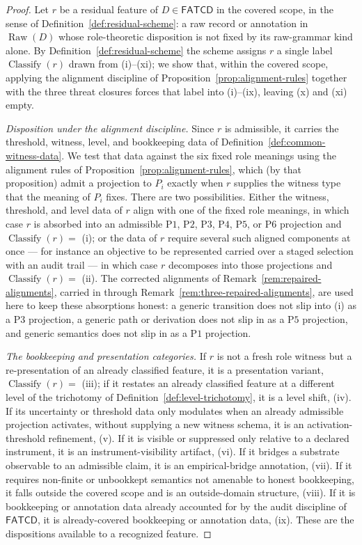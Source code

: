 \documentclass[11pt]{article}
\theoremstyle{definition}
\newcommand{\FATCD}{\ensuremath{\mathsf{FATCD}}}
\newcommand{\Raw}[1]{\ensuremath{\operatorname{Raw}\!\left(#1\right)}}
\newcommand{\Pone}{\ensuremath{\mathrm{P1}}}
\newcommand{\Ptwo}{\ensuremath{\mathrm{P2}}}
\newcommand{\Pthree}{\ensuremath{\mathrm{P3}}}
\newcommand{\Pfour}{\ensuremath{\mathrm{P4}}}
\newcommand{\Pfive}{\ensuremath{\mathrm{P5}}}
\newcommand{\Psix}{\ensuremath{\mathrm{P6}}}
\begin{document}
\begin{proof}
Let \(r\) be a residual feature of \(D \in \FATCD{}\) in the covered
scope, in the sense of Definition~\ref{def:residual-scheme}: a raw
record or annotation in \(\Raw{D}\) whose role-theoretic disposition is
not fixed by its raw-grammar kind alone. By
Definition~\ref{def:residual-scheme} the scheme assigns \(r\) a single
label \(\operatorname{Classify}(r)\) drawn from (i)--(xi); we show that,
within the covered scope, applying the alignment discipline of
Proposition~\ref{prop:alignment-rules} together with the three threat
closures forces that label into (i)--(ix), leaving (x) and (xi) empty.

\emph{Disposition under the alignment discipline.} Since \(r\) is
admissible, it carries the threshold, witness, level, and bookkeeping
data of Definition~\ref{def:common-witness-data}. We test that data
against the six fixed role meanings using the alignment rules of
Proposition~\ref{prop:alignment-rules}, which (by that proposition) admit
a projection to \(P_i\) exactly when \(r\) supplies the witness type that
the meaning of \(P_i\) fixes. There are two possibilities. Either the
witness, threshold, and level data of \(r\) align with one of the fixed
role meanings, in which case \(r\) is absorbed into an admissible
\Pone{}, \Ptwo{}, \Pthree{}, \Pfour{}, \Pfive{}, or \Psix{} projection
and \(\operatorname{Classify}(r) = \) (i); or the data of \(r\) require
several such aligned components at once --- for instance an objective to
be represented carried over a staged selection with an audit trail ---
in which case \(r\) decomposes into those projections and
\(\operatorname{Classify}(r) = \) (ii). The corrected alignments of
Remark~\ref{rem:repaired-alignments}, carried in through
Remark~\ref{rem:three-repaired-alignments}, are used here to keep these
absorptions honest: a generic transition does not slip into (i) as a
\Pthree{} projection, a generic path or derivation does not slip in as a
\Pfive{} projection, and generic semantics does not slip in as a \Pone{}
projection.

\emph{The bookkeeping and presentation categories.} If \(r\) is not a
fresh role witness but a re-presentation of an already classified
feature, it is a presentation variant, \(\operatorname{Classify}(r) = \)
(iii); if it restates an already classified feature at a different level
of the trichotomy of Definition~\ref{def:level-trichotomy}, it is a
level shift, (iv). If its uncertainty or threshold data only modulates
when an already admissible projection activates, without supplying a new
witness schema, it is an activation-threshold refinement, (v). If it is
visible or suppressed only relative to a declared instrument, it is an
instrument-visibility artifact, (vi). If it bridges a substrate
observable to an admissible claim, it is an empirical-bridge annotation,
(vii). If it requires non-finite or unbookkept semantics not amenable to
honest bookkeeping, it falls outside the covered scope and is an
outside-domain structure, (viii). If it is bookkeeping or annotation data
already accounted for by the audit discipline of \FATCD{}, it is
already-covered bookkeeping or annotation data, (ix). These are the dispositions available to a recognized feature.


\end{proof}
\end{document}
